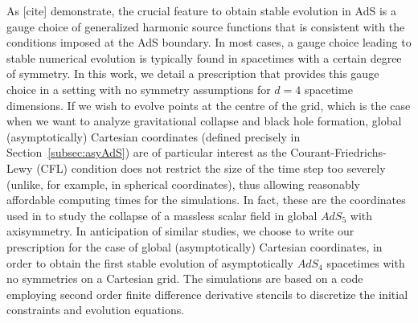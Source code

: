 \documentclass[a4paper,11pt]{article}
\numberwithin{equation}{section}
\begin{document}

As [cite] demonstrate, the crucial feature to obtain stable evolution in AdS is a gauge choice of generalized harmonic source functions that is consistent with the conditions imposed at the AdS boundary.
In most cases, a gauge choice leading to stable numerical evolution is typically found in spacetimes with a certain degree of symmetry.
In this work, we detail a prescription that provides this gauge choice in a setting with no symmetry assumptions for $d=4$ spacetime dimensions. 
If we wish to evolve points at the centre of the grid, which is the case when we want to analyze gravitational collapse and black hole formation, global (asymptotically) Cartesian coordinates (defined precisely in Section~\ref{subsec:asyAdS}) are of particular interest as the Courant-Friedrichs-Lewy (CFL) condition does not restrict the size of the time step too severely (unlike, for example, in spherical coordinates), thus allowing reasonably affordable computing times for the simulations.
In fact, these are the coordinates used in \cite{Bantilan:2017kok} to study the collapse of a massless scalar field in global $AdS_5$ with axisymmetry.
In anticipation of similar studies, we choose to write our prescription for the case of global (asymptotically) Cartesian coordinates, in order to obtain the first stable evolution of asymptotically $AdS_4$ spacetimes with no symmetries on a Cartesian grid.
The simulations are based on a code employing second order finite difference derivative stencils to discretize the initial constraints and evolution equations.
\end{document}
